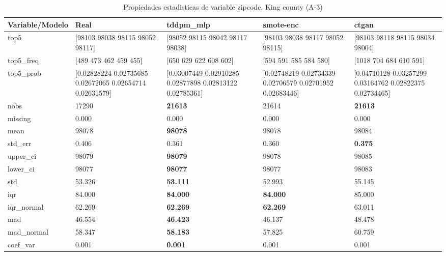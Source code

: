 \begin{table}[H]
\centering
\fontsize{8}{14}\selectfont
\caption{Propiedades  estadisticas de variable zipcode, King county (A-3)}
\label{table-stats-king county-a-3-zipcode}
\begin{tabular}{|l|m{10em}|m{10em}|m{10em}|m{10em}|}
\hline
 \rowcolor[gray]{0.8}
Variable/Modelo & Real & tddpm\_mlp & smote-enc & ctgan \\
\hline top5 & [98103 98038 98115 98052 98117] & [98052 98115 98042 98117 98038] & [98103 98038 98117 98052 98115] & [98103 98118 98115 98034 98004] \\
\hline top5\_freq & [489 473 462 459 455] & [650 629 622 608 602] & [594 591 585 584 580] & [1018  704  684  610  591] \\
\hline top5\_prob & [0.02828224 0.02735685 0.02672065 0.02654714 0.02631579] & [0.03007449 0.02910285 0.02877898 0.02813122 0.02785361] & [0.02748219 0.02734339 0.02706579 0.02701952 0.02683446] & [0.04710128 0.03257299 0.03164762 0.02822375 0.02734465] \\
\hline nobs & 17290 & \bfseries 21613 & \cellcolor[rgb]{0.9, 0.54, 0.52} 21614 & \bfseries 21613 \\
\hline missing & 0.000 & 0.000 & 0.000 & 0.000 \\
\hline mean & 98078 & \bfseries 98078 & 98078 & \cellcolor[rgb]{0.9, 0.54, 0.52} 98084 \\
\hline std\_err & 0.406 & 0.361 & \cellcolor[rgb]{0.9, 0.54, 0.52} 0.360 & \bfseries 0.375 \\
\hline upper\_ci & 98079 & \bfseries 98079 & 98078 & \cellcolor[rgb]{0.9, 0.54, 0.52} 98085 \\
\hline lower\_ci & 98077 & \bfseries 98077 & 98077 & \cellcolor[rgb]{0.9, 0.54, 0.52} 98083 \\
\hline std & 53.326 & \bfseries 53.111 & 52.993 & \cellcolor[rgb]{0.9, 0.54, 0.52} 55.145 \\
\hline iqr & 84.000 & \bfseries 84.000 & \bfseries 84.000 & \cellcolor[rgb]{0.9, 0.54, 0.52} 85.000 \\
\hline iqr\_normal & 62.269 & \bfseries 62.269 & \bfseries 62.269 & \cellcolor[rgb]{0.9, 0.54, 0.52} 63.011 \\
\hline mad & 46.554 & \bfseries 46.423 & 46.137 & \cellcolor[rgb]{0.9, 0.54, 0.52} 48.478 \\
\hline mad\_normal & 58.347 & \bfseries 58.183 & 57.825 & \cellcolor[rgb]{0.9, 0.54, 0.52} 60.759 \\
\hline coef\_var & 0.001 & \bfseries 0.001 & 0.001 & \cellcolor[rgb]{0.9, 0.54, 0.52} 0.001 \\

\end{tabular}
\end{table}
